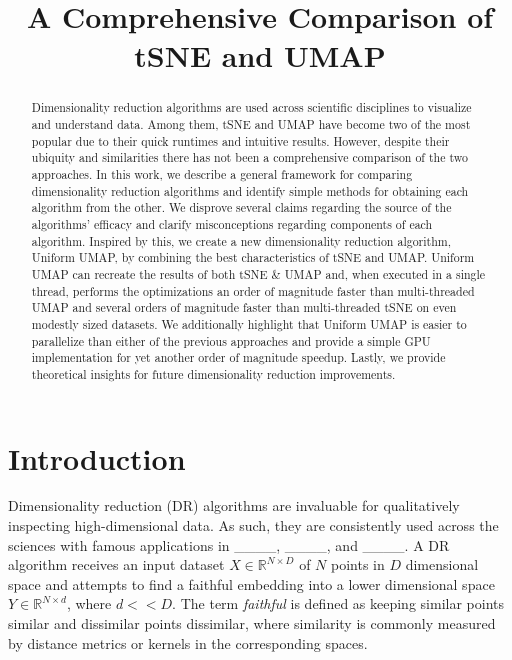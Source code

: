 \documentclass{article}
\title{A Comprehensive Comparison of tSNE and UMAP}
\theoremstyle{definition}
\begin{document}
\maketitle

\begin{abstract}
Dimensionality reduction algorithms are used across scientific disciplines to visualize and understand data. Among them, tSNE and UMAP have become two of the most
popular due to their quick runtimes and intuitive results. However, despite their ubiquity and similarities there
has not been a comprehensive comparison of the two approaches. In this work, we describe a general framework for comparing dimensionality reduction algorithms and
identify simple methods for obtaining each algorithm from the other. We disprove several claims regarding the source of the algorithms' efficacy and clarify
misconceptions regarding components of each algorithm. Inspired by this, we create a new dimensionality reduction algorithm, Uniform UMAP, by combining the best characteristics of tSNE
and UMAP. Uniform UMAP can recreate the results of both tSNE \& UMAP and, when executed in a single thread, performs the optimizations an order of magnitude faster than
multi-threaded UMAP and several orders of magnitude faster than multi-threaded tSNE on even modestly sized datasets. We additionally highlight that Uniform UMAP is easier to parallelize than either of the previous approaches and provide
a simple GPU implementation for yet another order of magnitude speedup.
Lastly, we provide theoretical insights for future dimensionality reduction improvements.
\end{abstract}

\section{Introduction}
Dimensionality reduction (DR) algorithms are invaluable for qualitatively inspecting high-dimensional data. As such, they are consistently used across the sciences
with famous applications in \_\_\_\_, \_\_\_\_, and \_\_\_\_. A DR algorithm receives an input dataset $X \in \mathbb{R}^{N \times D}$ of
$N$ points in $D$ dimensional space and
attempts to find a faithful embedding into a lower dimensional space $Y \in \mathbb{R}^{N \times d}$, where $d << D$. The term \textit{faithful} is
defined as keeping similar points similar and dissimilar points dissimilar, where similarity is commonly measured by distance metrics or kernels in the corresponding spaces.
\end{document}
